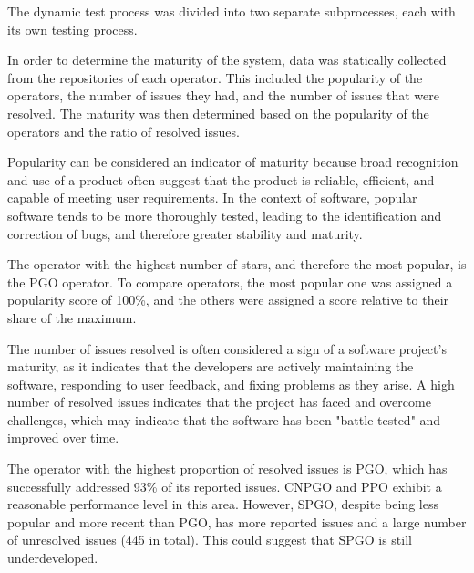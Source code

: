 
The dynamic test process was divided into two separate subprocesses, each with its own
testing process.






In order to determine the maturity of the system, data was statically collected from the repositories of each operator. This included the popularity of the operators, the number of issues they had, and the number of issues that were resolved. The maturity was then determined based on the popularity of the operators and the ratio of resolved issues.

Popularity can be considered an indicator of maturity because broad recognition and use of a product often suggest that the product is reliable, efficient, and capable of meeting user requirements. In the context of software, popular software tends to be more thoroughly tested, leading to the identification and correction of bugs, and therefore greater stability and maturity.

The operator with the highest number of stars, and therefore the most popular, is the PGO operator. To compare operators, the most popular one was assigned a popularity score of 100\%, and the others were assigned a score relative to their share of the maximum.


The number of issues resolved is often considered a sign of a software project's maturity, as it indicates that the developers are actively maintaining the software, responding to user feedback, and fixing problems as they arise. A high number of resolved issues indicates that the project has faced and overcome challenges, which may indicate that the software has been "battle tested" and improved over time.

The operator with the highest proportion of resolved issues is PGO, which has successfully addressed 93\% of its reported issues. CNPGO and PPO exhibit a reasonable performance level in this area. However, SPGO, despite being less popular and more recent than PGO, has more reported issues and a large number of unresolved issues (445 in total). This could suggest that SPGO is still underdeveloped.

